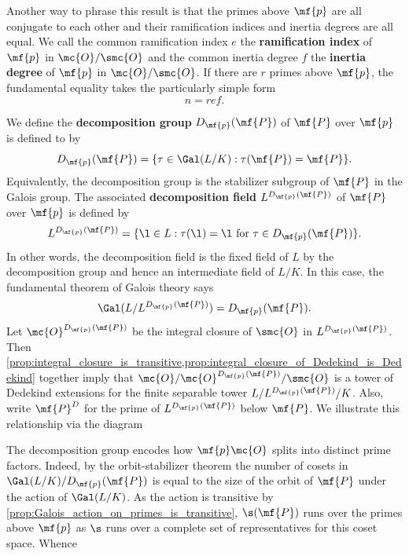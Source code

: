     Another way to phrase this result is that the primes above \(\mf{p}\) are all conjugate to each other and their ramification indices and inertia degrees are all equal. We call the common ramification index \(e\) the \textbf{ramification index} of \(\mf{p}\) in \(\mc{O}/\smc{O}\) and the common inertia degree \(f\) the \textbf{inertia degree} of \(\mf{p}\) in \(\mc{O}/\smc{O}\). If there are \(r\) primes above \(\mf{p}\), the fundamental equality takes the particularly simple form
    \[
      n = ref.
    \]

    We define the \textbf{decomposition group} \(D_{\mf{p}}(\mf{P})\) of \(\mf{P}\) over \(\mf{p}\) is defined to by
    \[
      D_{\mf{p}}(\mf{P}) = \{\tau \in \Gal(L/K):\tau(\mf{P}) = \mf{P}\}.
    \]
    Equivalently, the decomposition group is the stabilizer subgroup of \(\mf{P}\) in the Galois group. The associated \textbf{decomposition field} \(L^{D_{\mf{p}}(\mf{P})}\) of \(\mf{P}\) over \(\mf{p}\) is defined by
    \[
      L^{D_{\mf{p}}(\mf{P})} = \{\l \in L:\tau(\l) = \l \text{ for } \tau \in D_{\mf{p}}(\mf{P})\}.
    \]
    In other words, the decomposition field is the fixed field of \(L\) by the decomposition group and hence an intermediate field of \(L/K\). In this case, the fundamental theorem of Galois theory says
    \[
      \Gal(L/L^{D_{\mf{p}}(\mf{P})}) = D_{\mf{p}}(\mf{P}).
    \]
    Let \(\mc{O}^{D_{\mf{p}}(\mf{P})}\) be the integral closure of \(\smc{O}\) in \(L^{D_{\mf{p}}(\mf{P})}\). Then \cref{prop:integral_closure_is_transitive,prop:integral_closure_of_Dedekind_is_Dedekind} together imply that \(\mc{O}/\mc{O}^{D_{\mf{p}}(\mf{P})}/\smc{O}\) is a tower of Dedekind extensions for the finite separable tower \(L/L^{D_{\mf{p}}(\mf{P})}/K\). Also, write \(\mf{P}^{D}\) for the prime of \(L^{D_{\mf{p}}(\mf{P})}\) below \(\mf{P}\). We illustrate this relationship via the diagram
    \begin{center}
    \end{center}
    The decomposition group encodes how \(\mf{p}\mc{O}\) splits into distinct prime factors. Indeed, by the orbit-stabilizer theorem the number of cosets in \(\Gal(L/K)/D_{\mf{p}}(\mf{P})\) is equal to the size of the orbit of \(\mf{P}\) under the action of \(\Gal(L/K)\). As the action is transitive by \cref{prop:Galois_action_on_primes_is_transitive}, \(\s(\mf{P})\) runs over the primes above \(\mf{p}\) as \(\s\) runs over a complete set of representatives for this coset space. Whence
